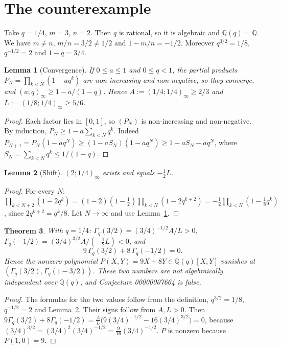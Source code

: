 \documentclass[11pt]{article}
\newtheorem{theorem}{Theorem}
\newtheorem{lemma}[theorem]{Lemma}
\theoremstyle{definition}
\theoremstyle{remark}
\renewcommand{\_}{\oldus\allowbreak}
\begin{document}
\section{The counterexample}

Take $q = 1/4$, $m = 3$, $n = 2$. Then $q$ is rational, so it is algebraic and $\mathbb{Q}(q) = \mathbb{Q}$.
We have $m \ne n$, $m/n = 3/2 \ne 1/2$ and $1 - m/n = -1/2$. Moreover $q^{3/2} = 1/8$, $q^{-1/2} = 2$ and
$1-q = 3/4$.

\begin{lemma}[Convergence]\label{lem:conv}
If $0 \le a \le 1$ and $0 \le q < 1$, the partial products $P_N = \prod_{k<N}(1-aq^k)$ are non-increasing
and non-negative, so they converge, and $(a;q)_\infty \ge 1 - a/(1-q)$. Hence $A := (1/4;1/4)_\infty \ge 2/3$
and $L := (1/8;1/4)_\infty \ge 5/6$.
\end{lemma}
\begin{proof}
Each factor lies in $[0,1]$, so $(P_N)$ is non-increasing and non-negative. By induction,
$P_N \ge 1 - a\sum_{k<N} q^k$. Indeed $P_{N+1} = P_N(1-aq^N) \ge (1 - aS_N)(1-aq^N) \ge 1 - aS_N - aq^N$,
where $S_N = \sum_{k<N} q^k \le 1/(1-q)$.
\end{proof}

\begin{lemma}[Shift]\label{lem:shift}
$(2;1/4)_\infty$ exists and equals $-\tfrac12 L$.
\end{lemma}
\begin{proof}
For every $N$:
$\prod_{k<N+2}(1-2q^k) = (1-2)(1-\tfrac12)\prod_{k<N}(1-2q^{k+2}) = -\tfrac12\prod_{k<N}(1-\tfrac18 q^k)$,
since $2q^{k+2} = q^k/8$. Let $N \to \infty$ and use Lemma~\ref{lem:conv}.
\end{proof}

\begin{theorem}\label{thm:main}
With $q = 1/4$:
$\Gamma_q(3/2) = (3/4)^{-1/2} A/L > 0$, $\Gamma_q(-1/2) = (3/4)^{3/2} A / (-\tfrac12 L) < 0$, and
\[ 9\,\Gamma_q(3/2) + 8\,\Gamma_q(-1/2) = 0. \]
Hence the nonzero polynomial $P(X,Y) = 9X + 8Y \in \mathbb{Q}(q)[X,Y]$ vanishes at
$(\Gamma_q(3/2), \Gamma_q(1-3/2))$. These two numbers are not algebraically independent over
$\mathbb{Q}(q)$, and Conjecture 00000007664 is false.
\end{theorem}
\begin{proof}
The formulas for the two values follow from the definition, $q^{3/2} = 1/8$, $q^{-1/2} = 2$ and
Lemma~\ref{lem:shift}. Their signs follow from $A, L > 0$. Then
$9\Gamma_q(3/2) + 8\Gamma_q(-1/2) = \frac{A}{L}\bigl(9(3/4)^{-1/2} - 16(3/4)^{3/2}\bigr) = 0$, because
$(3/4)^{3/2} = (3/4)^2 (3/4)^{-1/2} = \frac{9}{16}(3/4)^{-1/2}$. $P$ is nonzero because $P(1,0) = 9$.
\end{proof}
\end{document}

